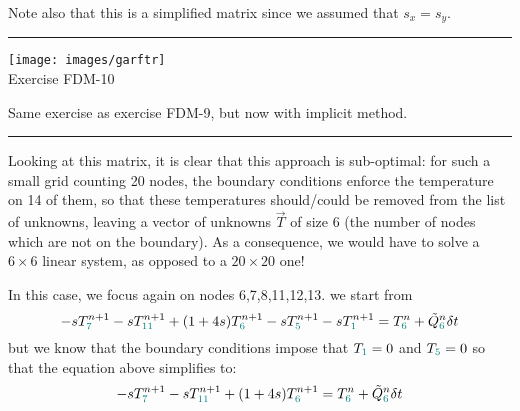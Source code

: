 \begin{landscape}

Note also that this is a simplified matrix since we assumed that $s_x=s_y$.

\end{landscape}

\begin{center}
\begin{minipage}[t]{0.77\textwidth}
\par\noindent\rule{\textwidth}{0.4pt}
\begin{center}
\texttt{[image: images/garftr]} \\
{\color{orange}Exercise FDM-10}
\end{center}

Same exercise as exercise FDM-9, but now with implicit method.

\par\noindent\rule{\textwidth}{0.4pt}
\end{minipage}
\end{center}


Looking at this matrix, it is clear that this approach is sub-optimal: for such a small grid counting
20 nodes, the boundary conditions enforce the temperature on 14 of them, so that these
temperatures should/could be removed from the list of unknowns, leaving a vector 
of unknowns $\vec{T}$ of size 6 (the number of nodes which are not on the boundary).
As a consequence, we would have to solve a $6\times 6$ linear system, as opposed to a $20\times 20$ one!

In this case, we focus again on nodes 6,7,8,11,12,13.
we start from 
\begin{equation}
-s T_{{\color{teal} 7}}^{n+1}
-s T_{{\color{teal} 11}}^{n+1} 
+(1+4s)T_{{\color{teal} 6}}^{n+1} 
-s T_{{\color{teal} 5}}^{n+1} 
-s T_{{\color{teal} 1}}^{n+1} 
= T_{{\color{teal} 6}}^n 
+\tilde{Q}_{{\color{teal} 6}}^n \delta t
\end{equation}
but we know that the boundary conditions impose that $T_{\color{teal}1}=0$ 
and $T_{\color{teal}5}=0$ so that the equation above simplifies to:
\begin{equation}
-s T_{{\color{teal} 7}}^{n+1}
-s T_{{\color{teal} 11}}^{n+1} 
+(1+4s)T_{{\color{teal} 6}}^{n+1} 
= T_{{\color{teal} 6}}^n 
+\tilde{Q}_{{\color{teal} 6}}^n\delta t
\end{equation}

